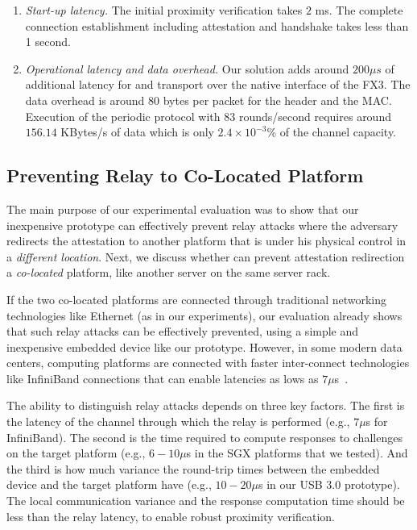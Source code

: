 \begin{enumerate}
  \item \emph{Start-up latency.} The initial proximity verification takes $2$ ms. The complete connection establishment including attestation and \tls handshake takes less than 1 second.  
  


  \item \emph{Operational latency and data overhead.} Our solution adds around $200 \mu s$ of additional latency for \tls and transport over the native \usb interface of the FX3. The data overhead is around 80 bytes per packet for the header and the MAC. Execution of the periodic \name protocol with $83$ rounds/second requires around $156.14$ KBytes/s of data which is only $2.4 \times 10^{-3}$\% of the  channel capacity. 


\end{enumerate}


\subsection{Preventing Relay to Co-Located Platform}
\label{sec:co-located}

The main purpose of our experimental evaluation was to show that our inexpensive \name prototype can effectively prevent relay attacks where the adversary redirects the attestation to another platform that is under his physical control in a \emph{different location}. Next, we discuss whether \name can prevent attestation redirection a \emph{co-located} platform, like another server on the same server rack.

If the two co-located platforms are connected through traditional networking technologies like Ethernet (as in our experiments), our evaluation already shows that such relay attacks can be effectively prevented, using a simple and inexpensive embedded device like our prototype. However, in some modern data centers, computing platforms are connected with faster inter-connect technologies like InfiniBand connections that can enable latencies as lows as $7 \mu$s~\cite{liu2003performance}. 

The ability to distinguish relay attacks depends on three key factors. The first is the latency of the channel through which the relay is performed (e.g., $7 \mu$s for InfiniBand). The second is the time required to compute responses to challenges on the target platform (e.g., $6-10 \mu$s in the SGX platforms that we tested). And the third is how much variance the round-trip times between the embedded device and the target platform have (e.g., $10-20 \mu$s in our USB 3.0 prototype). The local communication variance and the response computation time should be less than the relay latency, to enable robust proximity verification. 

